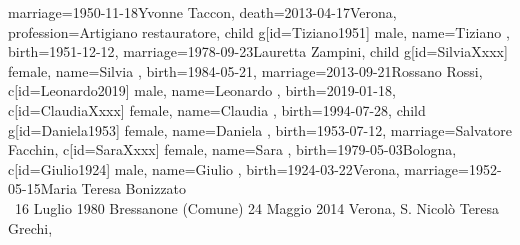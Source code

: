 \documentclass{article}
\begin{document}
\begin{midpage}
\begin{center}
\begin{genealogypicture}
{{{{{{{{                                marriage={1950-11-18}{Yvonne Taccon},
                                death={2013-04-17}{Verona},
                                profession={Artigiano restauratore},
                            }
                            child{
                                g[id=Tiziano1951]{
                                    male,
                                    name={Tiziano },
                                    birth={1951-12-12}{},
                                    marriage={1978-09-23}{Lauretta Zampini},
                                }
                                child{
                                    g[id=SilviaXxxx]{
                                        female,
                                        name={Silvia },
                                        birth={1984-05-21}{},
                                        marriage={2013-09-21}{Rossano Rossi},
                                    }
                                    c[id=Leonardo2019]{
                                        male,
                                        name={Leonardo },
                                        birth={2019-01-18}{},
                                    }
                                }
                                c[id=ClaudiaXxxx]{
                                    female,
                                    name={Claudia },
                                    birth={1994-07-28}{},
                                }
                            }
                            child{
                                g[id=Daniela1953]{
                                    female,
                                    name={Daniela },
                                    birth={1953-07-12}{},
                                    marriage={Salvatore Facchin}{},
                                }
                                c[id=SaraXxxx]{
                                    female,
                                    name={Sara },
                                    birth={1979-05-03}{Bologna},
                                }
                            }
                        }
                        c[id=Giulio1924]{
                            male,
                            name={Giulio },
                            birth={1924-03-22}{Verona},
                            marriage={1952-05-15}{Maria Teresa Bonizzato \\ \gtrsymMarried~16 Luglio 1980 \newline \hspace*{3mm} Bressanone (Comune) \newline \hspace*{3mm} 24 Maggio 2014 \newline \hspace*{3mm} Verona, S. Nicolò \newline \hspace*{3mm} Teresa Grechi},
}}}}}}}
\end{genealogypicture}
\end{center}
\end{midpage}
\end{document}
